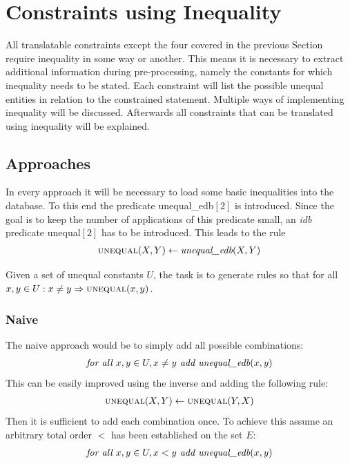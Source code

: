 \documentclass[hyperref,bachelorofscience,fleqn]{cgvpub}
\begin{document}
\section{Constraints using Inequality}\label{sec_constraints_using_inequality}
All translatable constraints except the four covered in the previous Section require inequality in some way or another. This means it is necessary to extract additional information during pre-processing, namely the constants for which inequality needs to be stated. Each constraint will list the possible unequal entities in relation to the constrained statement. Multiple ways of implementing inequality will be discussed. Afterwards all constraints that can be translated using inequality will be explained.

\subsection{Approaches}
In every approach it will be necessary to load some basic inequalities into the database. To this end the predicate unequal\_edb\([2]\) is introduced. Since the goal is to keep the number of applications of this predicate small, an \emph{idb} predicate unequal\([2]\) has to be introduced. This leads to the rule
\begin{align}
\textsc{unequal}(X, Y) \leftarrow \emph{unequal\_edb}(X, Y)
\end{align}

Given a set of unequal constants \(U\), the task is to generate rules so that for all \( x, y \in U: x \ne y \Rightarrow \textsc{unequal}(x, y)\).

\subsubsection{Naive}\label{subsubsec_naive}
The naive approach would be to simply add all possible combinations:
\begin{align}
\emph{for all } x, y \in U, x \ne y \emph{ add } \emph{unequal\_edb}(x, y)
\end{align}
This can be easily improved using the inverse and adding the following rule:
\begin{align}\label{equ_inverse}
\textsc{unequal}(X, Y) \leftarrow \textsc{unequal}(Y, X)
\end{align}
Then it is sufficient to add each combination once. To achieve this assume an arbitrary total order \(<\) has been established on the set \(E\):
\begin{align}
\emph{for all } x, y \in U, x < y \emph{ add } \emph{unequal\_edb}(x, y)
\end{align}
\end{document}
